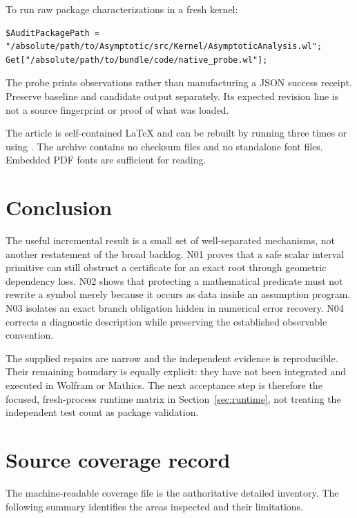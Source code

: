 \documentclass[11pt,letterpaper]{article}
\newcommand{\code}[1]{\texttt{\detokenize{#1}}}
\begin{document}
To run raw package characterizations in a fresh kernel:
\begin{lstlisting}
$AuditPackagePath = "/absolute/path/to/Asymptotic/src/Kernel/AsymptoticAnalysis.wl";
Get["/absolute/path/to/bundle/code/native_probe.wl"];
\end{lstlisting}
The probe prints observations rather than manufacturing a JSON success receipt. Preserve baseline and candidate output separately. Its expected revision line is not a source fingerprint or proof of what was loaded.

The article is self-contained LaTeX and can be rebuilt by running \code{pdflatex} three times or using \code{build.sh}. The archive contains no checksum files and no standalone font files. Embedded PDF fonts are sufficient for reading.

\section{Conclusion}

The useful incremental result is a small set of well-separated mechanisms, not another restatement of the broad backlog. N01 proves that a safe scalar interval primitive can still obstruct a certificate for an exact root through geometric dependency loss. N02 shows that protecting a mathematical predicate must not rewrite a symbol merely because it occurs as data inside an assumption program. N03 isolates an exact branch obligation hidden in numerical error recovery. N04 corrects a diagnostic description while preserving the established observable convention.

The supplied repairs are narrow and the independent evidence is reproducible. Their remaining boundary is equally explicit: they have not been integrated and executed in Wolfram or Mathics. The next acceptance step is therefore the focused, fresh-process runtime matrix in Section~\ref{sec:runtime}, not treating the independent test count as package validation.

\appendix
\section{Source coverage record}

The machine-readable coverage file is the authoritative detailed inventory. The following summary identifies the areas inspected and their limitations.
\end{document}
